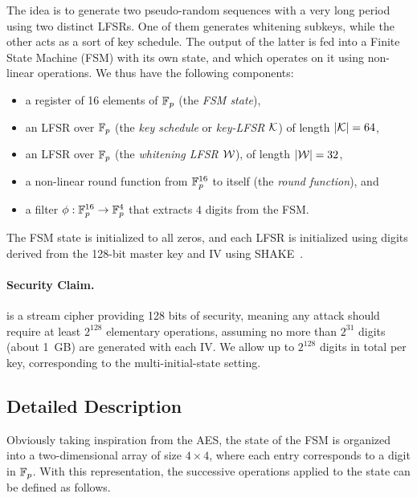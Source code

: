 The idea is to generate two pseudo-random sequences with a very long
period using two distinct LFSRs. One of them generates whitening
subkeys, while the other acts as a sort of key schedule. The output of
the latter is fed into a Finite State Machine (FSM) with its own
state, and which operates on it using non-linear operations. We thus
have the following components:
\begin{itemize}
\item a register of 16 elements of $\mathbb{F}_{p}$ (the \emph{FSM state}),
\item an LFSR over $\mathbb{F}_{p}$ (the \emph{key schedule} or \emph{key-LFSR} $\mathcal{K}$) of length $|\mathcal{K}| = 64$, 
\item an LFSR over $\mathbb{F}_{p}$ (the \emph{whitening LFSR} $\mathcal{W}$), of length $|\mathcal{W}| = 32$,
\item a non-linear round function from $\mathbb{F}_{p}^{16}$ to itself (the \emph{round function}), and
\item a filter $\phi : \mathbb{F}_{p}^{16} \to \mathbb{F}_{p}^4$ that extracts $4$ digits from the FSM.
\end{itemize}



The FSM state is initialized to all zeros, and each LFSR is initialized using digits derived from the 128-bit master key and IV using SHAKE~\cite{sha-3}. 


\paragraph{Security Claim.} \coolName{} is a stream cipher providing 128 bits of security, meaning any attack should require at least $2^{128}$ elementary operations, assuming no more than $2^{31}$ digits (about 1~GB) are generated with each IV.  We allow up to $2^{128}$ digits in total per key, corresponding to the multi-initial-state setting.





\subsection{Detailed Description}
\label{sec:sepc-details}

Obviously taking inspiration from the \gls{AES}, the state of the FSM is organized into a two-dimensional array of size $4\times 4$, where each entry corresponds to a digit in $\mathbb{F}_p$. With this representation, the successive operations applied to the state can be defined as follows.

